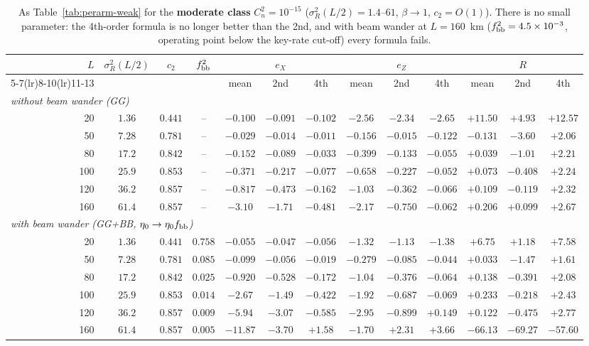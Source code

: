 \begin{table}[htbp]
\centering\scriptsize
\caption{As Table~\ref{tab:perarm-weak} for the \textbf{moderate class} $C_n^2=10^{-15}$ ($\sigma_R^2(L/2)=1.4$--$61$, $\beta\to1$, $c_2=O(1)$). There is no small parameter: the 4th-order formula is no longer better than the 2nd, and with beam wander at $L=160$~km ($f_{\rm bb}^2=4.5\times10^{-3}$, operating point below the key-rate cut-off) every formula fails.}
\label{tab:perarm-mod}
\begin{tabular}{rcccccccccccc}
\toprule
$L$ & $\sigma_R^2(L/2)$ & $c_2$ & $f_{\rm bb}^2$ & \multicolumn{3}{c}{$e_X$} & \multicolumn{3}{c}{$e_Z$} & \multicolumn{3}{c}{$R$}\\
\cmidrule(lr){5-7}\cmidrule(lr){8-10}\cmidrule(lr){11-13}
 & & & & mean & 2nd & 4th & mean & 2nd & 4th & mean & 2nd & 4th\\
\midrule
\multicolumn{13}{l}{\emph{without beam wander (GG)}} \\
20 & $1.36$ & $0.441$ & -- & $-0.100$ & $-0.091$ & $-0.102$ & $-2.56$ & $-2.34$ & $-2.65$ & $+11.50$ & $+4.93$ & $+12.57$ \\
50 & $7.28$ & $0.781$ & -- & $-0.029$ & $-0.014$ & $-0.011$ & $-0.156$ & $-0.015$ & $-0.122$ & $-0.131$ & $-3.60$ & $+2.06$ \\
80 & $17.2$ & $0.842$ & -- & $-0.152$ & $-0.089$ & $-0.033$ & $-0.399$ & $-0.133$ & $-0.055$ & $+0.039$ & $-1.01$ & $+2.21$ \\
100 & $25.9$ & $0.853$ & -- & $-0.371$ & $-0.217$ & $-0.077$ & $-0.658$ & $-0.227$ & $-0.052$ & $+0.073$ & $-0.408$ & $+2.24$ \\
120 & $36.2$ & $0.857$ & -- & $-0.817$ & $-0.473$ & $-0.162$ & $-1.03$ & $-0.362$ & $-0.066$ & $+0.109$ & $-0.119$ & $+2.32$ \\
160 & $61.4$ & $0.857$ & -- & $-3.10$ & $-1.71$ & $-0.481$ & $-2.17$ & $-0.750$ & $-0.062$ & $+0.206$ & $+0.099$ & $+2.67$ \\
\midrule
\multicolumn{13}{l}{\emph{with beam wander (GG+BB, $\eta_0\to\eta_0f_{\rm bb}$)}} \\
20 & $1.36$ & $0.441$ & $0.758$ & $-0.055$ & $-0.047$ & $-0.056$ & $-1.32$ & $-1.13$ & $-1.38$ & $+6.75$ & $+1.18$ & $+7.58$ \\
50 & $7.28$ & $0.781$ & $0.085$ & $-0.099$ & $-0.056$ & $-0.019$ & $-0.279$ & $-0.085$ & $-0.044$ & $+0.033$ & $-1.47$ & $+1.61$ \\
80 & $17.2$ & $0.842$ & $0.025$ & $-0.920$ & $-0.528$ & $-0.172$ & $-1.04$ & $-0.376$ & $-0.064$ & $+0.138$ & $-0.391$ & $+2.08$ \\
100 & $25.9$ & $0.853$ & $0.014$ & $-2.67$ & $-1.49$ & $-0.422$ & $-1.92$ & $-0.687$ & $-0.069$ & $+0.233$ & $-0.218$ & $+2.43$ \\
120 & $36.2$ & $0.857$ & $0.009$ & $-5.94$ & $-3.07$ & $-0.585$ & $-2.95$ & $-0.899$ & $+0.149$ & $+0.122$ & $-0.475$ & $+2.77$ \\
160 & $61.4$ & $0.857$ & $0.005$ & $-11.87$ & $-3.70$ & $+1.58$ & $-1.70$ & $+2.31$ & $+3.66$ & $-66.13$ & $-69.27$ & $-57.60$ \\


\end{tabular}
\end{table}
